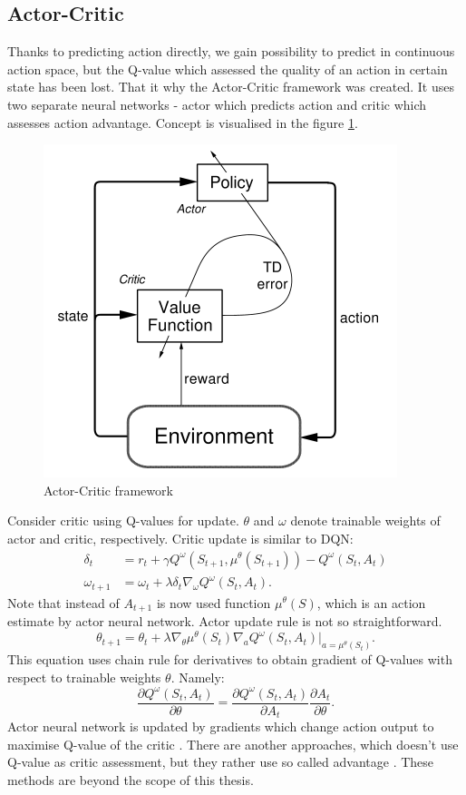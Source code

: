 \subsection{Actor-Critic}
Thanks to predicting action directly, we gain possibility to predict in continuous action space, but the Q-value which assessed the quality of an action in certain state has been lost. That it why the Actor-Critic framework was created. It uses two separate neural networks - actor which predicts action and critic which assesses action advantage. Concept is visualised in the figure \ref{fig:actorcritic}.
\begin{figure}[H]
\centering
\includegraphics[scale=0.55]{fig/actor-critic.png}
\caption{Actor-Critic framework}
\label{fig:actorcritic}
\end{figure}
\clearpage

Consider critic using Q-values for update. $\theta$ and $\omega$ denote trainable weights of actor and critic, respectively. Critic update is similar to DQN:
\begin{align}
\delta_t &= r_t + \gamma Q^\omega(S_{t+1}, \mu ^\theta (S_{t+1})) - Q^\omega(S_t, A_t)\\
\omega_{t+1} &= \omega_t + \lambda \delta_t \nabla_\omega Q^\omega(S_t, A_t).
\end{align}
Note that instead of $A_{t+1}$ is now used function $\mu^\theta(S)$, which is an action estimate by actor neural network. Actor update rule is not so straightforward. 
\begin{equation}
\theta_{t+1} = \theta_t + \lambda\nabla_\theta \mu^\theta(S_t)\nabla_a Q^\omega (S_t, A_t)|_{a = \mu^\theta(S_t)}.
\end{equation}
This equation uses chain rule for derivatives to obtain gradient of Q-values with respect to trainable weights $\theta$. Namely:
\begin{equation}
\frac{\partial Q^\omega(S_t, A_t)}{\partial \theta} = \frac{\partial Q^\omega(S_t, A_t)}{\partial A_t} \frac{\partial A_t}{\partial \theta}.
\end{equation}
Actor neural network is updated by gradients which change action output to maximise Q-value of the critic \cite{silver2014}.
There are another approaches, which doesn't use Q-value as critic assessment, but they rather use so called advantage \cite{schulman2017}. These methods are beyond the scope of this thesis. 

